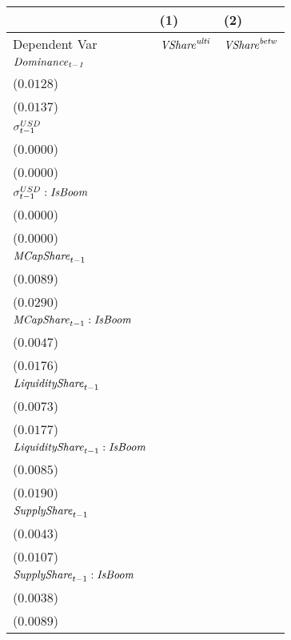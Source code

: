 \begin{tabular}{lll}
\toprule
{} &                                       (1) &                                       (2) \\
\midrule
Dependent Var                             &               ${\it VShare}^{\it ulti}$ &               ${\it VShare}^{\it betw}$ \\
$\it Dominance_{t-1}$                     &   \makecell{$0.8681^{***}$ \\ ($0.0128$)} &   \makecell{$0.8704^{***}$ \\ ($0.0137$)} \\
${\it \sigma}^{USD}_{t-1}$                &    \makecell{$-0.0000^{*}$ \\ ($0.0000$)} &   \makecell{$0.0000^{***}$ \\ ($0.0000$)} \\
${\it \sigma}^{USD}_{t-1}:{\it IsBoom}$   &   \makecell{$0.0000^{***}$ \\ ($0.0000$)} &  \makecell{$-0.0000^{***}$ \\ ($0.0000$)} \\
${\it MCapShare}_{t-1}$                   &      \makecell{$0.0113^{}$ \\ ($0.0089$)} &     \makecell{$-0.0031^{}$ \\ ($0.0290$)} \\
${\it MCapShare}_{t-1}:{\it IsBoom}$      &     \makecell{$-0.0003^{}$ \\ ($0.0047$)} &   \makecell{$0.0828^{***}$ \\ ($0.0176$)} \\
${\it LiquidityShare}_{t-1}$              &   \makecell{$0.0480^{***}$ \\ ($0.0073$)} &   \makecell{$0.1099^{***}$ \\ ($0.0177$)} \\
${\it LiquidityShare}_{t-1}:{\it IsBoom}$ &     \makecell{$-0.0012^{}$ \\ ($0.0085$)} &     \makecell{$-0.0020^{}$ \\ ($0.0190$)} \\
${\it SupplyShare}_{t-1}$                 &   \makecell{$0.0195^{***}$ \\ ($0.0043$)} &   \makecell{$0.0428^{***}$ \\ ($0.0107$)} \\
${\it SupplyShare}_{t-1}:{\it IsBoom}$    &    \makecell{$-0.0069^{*}$ \\ ($0.0038$)} &   \makecell{$-0.0198^{**}$ \\ ($0.0089$)} \\

\end{tabular}

